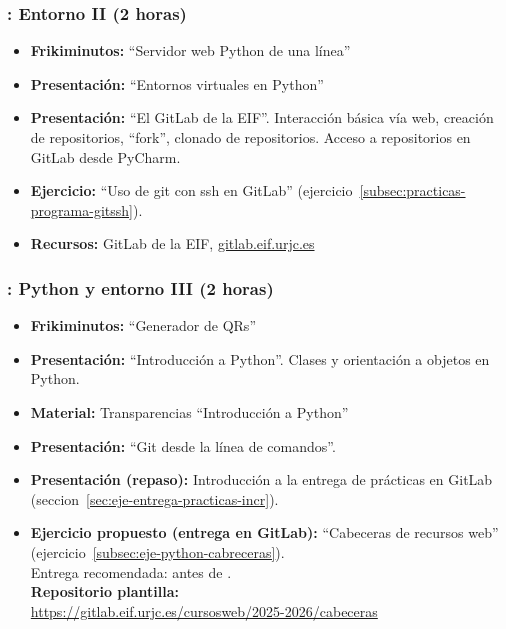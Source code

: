 \documentclass[a4paper,12pt]{article}
\begin{document}
\subsubsection{\juevesB: Entorno II  (2 horas)}
\label{cal:juevesB}

\begin{itemize}
\item \textbf{Frikiminutos:} ``Servidor web Python de una línea''
\item \textbf{Presentación:} ``Entornos virtuales en Python''
\item \textbf{Presentación:} ``El GitLab de la EIF''. Interacción básica vía web, creación de repositorios, ``fork'', clonado de repositorios. Acceso a repositorios en GitLab desde PyCharm.
\item \textbf{Ejercicio:} ``Uso de git con ssh en GitLab'' (ejercicio~\ref{subsec:practicas-programa-gitssh}).
\item \textbf{Recursos:} GitLab de la EIF, \url{gitlab.eif.urjc.es}
\end{itemize}

\subsubsection{\juevesC: Python y entorno III  (2 horas)}
\label{cal:juevesC}

\begin{itemize}
\item \textbf{Frikiminutos:} ``Generador de QRs''
\item \textbf{Presentación:} ``Introducción a Python''. Clases y orientación a objetos en Python.
\item \textbf{Material:} Transparencias ``Introducción a Python''
\item \textbf{Presentación:} ``Git desde la línea de comandos''.
\item \textbf{Presentación (repaso):} Introducción a la entrega de prácticas en GitLab (seccion~\ref{sec:eje-entrega-practicas-incr}).
\item \textbf{Ejercicio propuesto (entrega en GitLab):} ``Cabeceras de recursos web'' (ejercicio~\ref{subsec:eje-python-cabreceras}). \\
  Entrega recomendada: antes de \juevesD. \\
  \textbf{Repositorio plantilla:} \\
\url{https://gitlab.eif.urjc.es/cursosweb/2025-2026/cabeceras}

\end{itemize}
\end{document}

